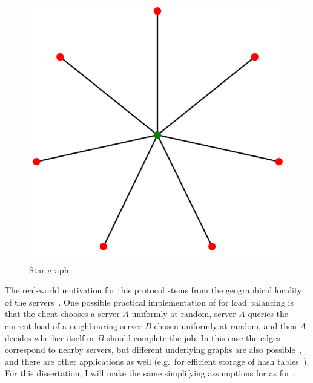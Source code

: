 \begin{figure}[hbt!] \label{star-graph}
    \centering
    \includegraphics[scale=0.1]{Chapter2/Figs/star_graph.png}
    \caption{Star graph~\cite{stargraph}}
\end{figure}

The real-world motivation for this protocol stems from the geographical locality of the servers~\cite{krishnaram2006graphicaltwochoiceoriginal}. One possible practical implementation of \GraphicalTwoChoice for load balancing is that the client chooses a server $A$ uniformly at random, server $A$ queries the current load of a neighbouring server $B$ chosen uniformly at random, and then $A$ decides whether itself or $B$ should complete the job. In this case the edges correspond to nearby servers, but different underlying graphs are also possible~\cite{peres2015oneplusbeta}, and there are other applications as well (e.g.\ for efficient storage of hash tables~\cite{krishnaram2006graphicaltwochoiceoriginal}). For this dissertation, I will make the same simplifying assumptions for \GraphicalTwoChoice as for \TwoThinning. 


